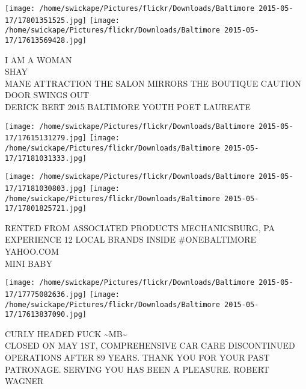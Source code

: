\documentclass[10pt,letterpaper]{article}
\begin{document}
\texttt{[image: /home/swickape/Pictures/flickr/Downloads/Baltimore 2015-05-17/17801351525.jpg]}
\texttt{[image: /home/swickape/Pictures/flickr/Downloads/Baltimore 2015-05-17/17613569428.jpg]}

I AM A WOMAN\\
SHAY\\
MANE ATTRACTION THE SALON MIRRORS THE BOUTIQUE CAUTION DOOR SWINGS OUT\\
DERICK BERT 2015 BALTIMORE YOUTH POET LAUREATE\\
\pagebreak

\texttt{[image: /home/swickape/Pictures/flickr/Downloads/Baltimore 2015-05-17/17615131279.jpg]}
\texttt{[image: /home/swickape/Pictures/flickr/Downloads/Baltimore 2015-05-17/17181031333.jpg]}

\texttt{[image: /home/swickape/Pictures/flickr/Downloads/Baltimore 2015-05-17/17181030803.jpg]}
\texttt{[image: /home/swickape/Pictures/flickr/Downloads/Baltimore 2015-05-17/17801825721.jpg]}

RENTED FROM ASSOCIATED PRODUCTS MECHANICSBURG, PA\\
EXPERIENCE 12 LOCAL BRANDS INSIDE \#ONEBALTIMORE\\
YAHOO.COM\\
MINI BABY\\
\pagebreak

\texttt{[image: /home/swickape/Pictures/flickr/Downloads/Baltimore 2015-05-17/17775082636.jpg]}
\texttt{[image: /home/swickape/Pictures/flickr/Downloads/Baltimore 2015-05-17/17613837090.jpg]}

CURLY HEADED FUCK \textasciitilde{}MB\textasciitilde{}\\
CLOSED ON MAY 1ST, COMPREHENSIVE CAR CARE DISCONTINUED OPERATIONS AFTER 89 YEARS.  THANK YOU FOR YOUR PAST PATRONAGE.  SERVING YOU HAS BEEN A PLEASURE.  ROBERT WAGNER\\
\pagebreak
\end{document}

